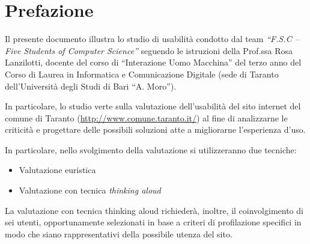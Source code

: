 \chapter*{Prefazione}\label{chap:prefazione}

Il presente documento illustra lo studio di usabilità condotto dal team \textit{``F.S.C -- Five Students of Computer Science''} seguendo le istruzioni della Prof.ssa Rosa Lanzilotti, docente del corso di ``Interazione Uomo Macchina'' del terzo anno del Corso di Laurea in Informatica e Comunicazione Digitale (sede di Taranto dell'Università degli Studi di Bari ``A. Moro'').

In particolare, lo studio verte sulla valutazione dell'usabilità del sito internet del comune di Taranto (\url{http://www.comune.taranto.it/}) al fine di analizzarne le criticità e progettare delle possibili soluzioni atte a migliorarne l'esperienza d'uso.

In particolare, nello svolgimento della valutazione si utilizzeranno due tecniche:
\begin{itemize}
	\item Valutazione euristica
	\item Valutazione con tecnica \textit{thinking aloud}
\end{itemize}

La valutazione con tecnica thinking aloud richiederà, inoltre, il coinvolgimento di sei utenti, opportunamente selezionati in base a criteri di profilazione specifici in modo che siano rappresentativi della possibile utenza del sito.